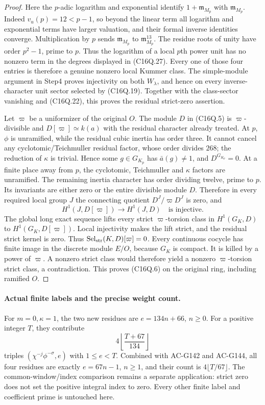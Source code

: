\begin{proof}
Here the $p$-adic logarithm and exponential identify
$1+\mathfrak m_{M_p}$ with $\mathfrak m_{M_p}$.
Indeed $v_u(p)=12<p-1$, so beyond the linear term all logarithm
and exponential terms have larger valuation, and their formal
inverse identities converge.
Multiplication by $p$ sends $\mathfrak m_{M_p}$ to
$\mathfrak m_{M_p}^{13}$.
The residue roots of unity have order $p^2-1$, prime to $p$.
Thus the logarithm of a local $p$th power unit has no nonzero
term in the degrees displayed in (C16Q.27).
Every one of those four entries is therefore a genuine nonzero
local Kummer class.
The simple-module argument in Step4 proves injectivity on
both $W_\lambda$, and hence on every inverse-character unit
sector selected by (C16Q.19).
Together with the class-sector vanishing and (C16Q.22), this
proves the residual strict-zero assertion.

Let $\varpi$ be a uniformizer of the original $O$.
The module $D$ in (C16Q.5) is $\varpi$-divisible and
$D[\varpi]\simeq k(a)$ with the residual character already treated.
At $p$, $\phi$ is unramified, while the residual cubic inertia
has order three.
It cannot cancel any cyclotomic/Teichmuller residual factor,
whose order divides $268$; the reduction of $\kappa$ is trivial.
Hence some $g\in G_{K_p}$ has $\bar a(g)\ne1$, and
$D^{G_{K_p}}=0$.
At a finite place away from $p$, the cyclotomic, Teichmuller and
$\kappa$ factors are unramified.
The remaining inertia character has order dividing twelve,
prime to $p$.
Its invariants are either zero or the entire divisible module $D$.
Therefore in every required local group $J$ the connecting
quotient $D^J/\varpi D^J$ is zero, and
\[
                  H^1(J,D[\varpi])\longrightarrow H^1(J,D)
                         \quad\text{is injective}.
 \tag{C16Q.28}
\]
The global long exact sequence lifts every strict
$\varpi$-torsion class in $H^1(G_K,D)$ to $H^1(G_K,D[\varpi])$.
Local injectivity makes the lift strict, and the residual
strict kernel is zero.
Thus $\operatorname{Sel}_{\rm str}(K,D)[\varpi]=0$.
Every continuous cocycle has finite image in the discrete module
$E/O$, because $G_K$ is compact.
It is killed by a power of $\varpi$.
A nonzero strict class would therefore yield a nonzero
$\varpi$-torsion strict class, a contradiction.
This proves (C16Q.6) on the original ring, including ramified $O$.
\end{proof}

\paragraph{Actual finite labels and the precise weight count.}
For $m=0,\kappa=1$, the two new residues are
$e=134n+66$, $n\geq0$.
For a positive integer $T$, they contribute
\[
                 4\left\lfloor\frac{T+67}{134}\right\rfloor
 \tag{C16Q.29}
\]
triples $(\chi^{-j}\phi^{-\sigma},e)$ with $1\leq e<T$.
Combined with AC-G142 and AC-G144, all four residues are exactly
$e=67n-1$, $n\geq1$, and their count is $4\lfloor T/67\rfloor$.
The common-window/index comparison remains a separate application:
strict zero does not set the positive integral index to zero.
Every other finite label and coefficient prime is untouched here.


